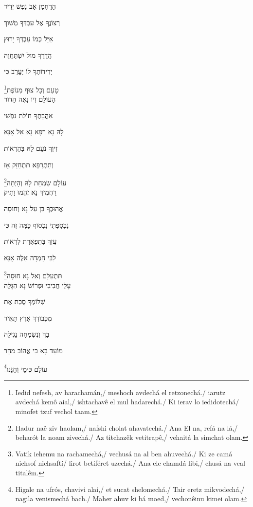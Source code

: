 הָרַחְמָן אַב נֶפֶשׁ יְדִיד

רְצוֹנֶךָ אֶל עַבְדְּךָ מְשׁוֹךְ

אַיָּל כְּמוֹ עַבְדְּךָ יָרוּץ

הֲדָרֶךָ מוּל יִשְׁתַּחֲוֶה

יְדִידוֹתֶךָ לוֹ יֶעֱרַב  כִּי

\footnote{Iedid nefesh, av harachamán,/ meshoch avdechá el retzonechá./ iarutz avdechá kemô aial,/ ishtachavê el mul hadarechá./ Ki ierav lo iedidotechá/ minofet tzuf vechol taam.}טָעַם וְכָל צוּף מִנוֹפֶת\\[10pt]

הָעוֹלָם זִיו נָאֶה הָדוּר

אַהֲבָתֶךָ חוֹלַת נַפְשִׁי

לָהּ נָא רְפָא נָא אֵל אָנָּא

זִיוֶךָ נֹעַם לָהּ בְּהַרְאוֹת

וְתִתְרַפֵּא תִּתְחַזֵּק אָז

\footnote{Hadur naê ziv haolam,/ nafshi cholat ahavatechá./ Ana El na, refá na lá,/ beharót la noam zivechá./ Az titchazêk vetitrapê,/ vehaitá la simchat olam.}עוֹלָם שִׂמְחַת לָהּ וְהָיְתָה\\[10pt]

רַחֲמֶיךָ נָא יֶהֱמוּ וָתִיק

אֲהוּבֶךָ בֵּן עַל נָּא וְחוּסָה

נִכְסַפְתִּי נִכְסוֹף כַּמֶּה זֶה כִּי

עֻזֶּךָ בְּתִפְאֶרֶת לִרְאוֹת

לִבִּי חָמְדָה אֵלֶּה אָנָּא

\footnote{Vatik iehemu na rachamechá,/ vechusá na al ben ahuvechá./ Ki ze camá nichsof nichsaftí/ lirot betiféret uzechá./ Ana ele chamdá libi,/ chusá na veal titalêm.}תִּתְעַלָּם וְאַל נָּא חוּסָה\\[10pt]

עָלַי חֲבִיבִי וּפְרוֹשׂ נָא הִגָּלֶה

שְׁלוֹמֶךָ סֻכַּת אֶת

מִכְּבוֹדֶךָ אֶרֶץ תָּאִיר

בָךְ וְנִשְׂמְחָה נָגִילָה

מוֹעֵד בָא כִּי אֱהוֹב מַהֵר

\footnote{Higale na ufrós, chavivi alai,/ et sucat shelomechá./ Tair eretz mikvodechá,/ nagila venismechá bach./ Maher ahuv ki bá moed,/ vechonêinu kimei olam.}עוֹלָם כִּימֵי וְחָנֵּנוּ



\movetooddpage
\raggedright

